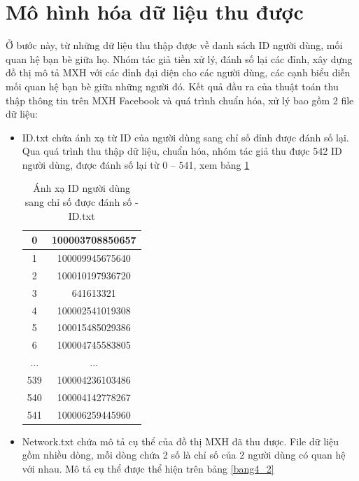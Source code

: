 \section{Mô hình hóa dữ liệu thu được}
Ở bước này, từ những dữ liệu thu thập được về danh sách ID người dùng, mối quan hệ bạn bè giữa họ. Nhóm tác giả tiền xử lý, đánh số lại các đỉnh, xây dựng đồ thị mô tả MXH với các đỉnh đại diện cho các người dùng, các cạnh biểu diễn mối quan hệ bạn bè giữa những người đó. Kết quả đầu ra của thuật toán thu thập thông tin trên MXH Facebook và quá trình chuẩn hóa, xử lý bao gồm 2 file dữ liệu:
\begin {itemize}
\item ID.txt chứa ánh xạ từ ID của người dùng sang chỉ số đỉnh được đánh số lại. Qua quá trình thu thập dữ liệu, chuẩn hóa, nhóm tác giả thu được 542 ID người dùng, được đánh số lại từ 0 – 541, xem bảng \ref{bang4_1}		
\begin{table} [!htp]
	\centering 
	\begin{tabular}{|c|c|}
		\hline 
		0 & 100003708850657 \\ 
		\hline 
		1 & 100009945675640 \\ 
		\hline 
		2 & 100010197936720 \\ 
		\hline 
		3 & 641613321 \\ 
		\hline 
		4 & 100002541019308 \\ 
		\hline 
		5 & 100015485029386 \\ 
		\hline 
		6 & 100004745583805 \\ 
		\hline 
		... & ... \\ 
		\hline 
		539 & 100004236103486 \\ 
		\hline 
		540 & 100004142778267 \\ 
		\hline 
		541 & 100006259445960 \\ 
		\hline 
	\end{tabular} 
	\caption{Ánh xạ ID người dùng sang chỉ số được đánh số - ID.txt}
	\label{bang4_1}
\end{table}
\item Network.txt chứa mô tả cụ thể của đồ thị MXH đã thu được. File dữ liệu gồm nhiều dòng, mỗi dòng chứa 2 số là chỉ số của 2 người dùng có quan hệ với nhau. Mô tả cụ thể được thể hiện trên bảng \ref{bang4_2}


\end{itemize}
